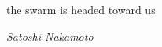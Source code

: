\vspace*{100mm} 
\begin{displayquote}{

\large{the swarm is headed toward us}
}

\textit{Satoshi Nakamoto}
\end{displayquote}